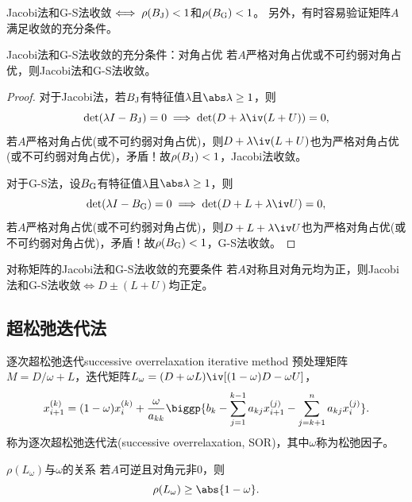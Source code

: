 \begin{remark}
    Jacobi法和G-S法收敛$\iff\rho(B_\text J)<1$和$\rho(B_\text G)<1$。
    另外，有时容易验证矩阵$A$满足收敛的充分条件。
\end{remark}

\begin{theorem}
    {Jacobi法和G-S法收敛的充分条件：对角占优}{}
    若$A$严格对角占优或不可约弱对角占优，则Jacobi法和G-S法收敛。
\end{theorem}

\begin{proof}
    对于Jacobi法，若$B_\text J$有特征值$\lambda$且$\abs\lambda\geq 1$，则 
    \[
        \det(\lambda I-B_\text J)=0\implies\det(D+\lambda\iv(L+U))=0,
    \]
    若$A$严格对角占优(或不可约弱对角占优)，则$D+\lambda\iv(L+U)$也为严格对角占优(或不可约弱对角占优)，矛盾！故$\rho(B_\text J)<1$，Jacobi法收敛。

    对于G-S法，设$B_\text G$有特征值$\lambda$且$\abs\lambda\geq 1$，则 
    \[
        \det(\lambda I-B_\text G)=0\implies\det(D+L+\lambda\iv U)=0,
    \]
    若$A$严格对角占优(或不可约弱对角占优)，则$D+L+\lambda\iv U$也为严格对角占优(或不可约弱对角占优)，矛盾！故$\rho(B_\text G)<1$，G-S法收敛。
\end{proof}

\begin{theorem}
    {对称矩阵的Jacobi法和G-S法收敛的充要条件}{}
    若$A$对称且对角元均为正，则Jacobi法和G-S法收敛$\iff D\pm(L+U)$均正定。
\end{theorem}

\subsection{超松弛迭代法}

\begin{example}
    {逐次超松弛迭代}{successive overrelaxation iterative method}
    预处理矩阵$M=D/\omega+L$，迭代矩阵$L_\omega=(D+\omega L)\iv[(1-\omega)D-\omega U]$，
    \begin{equation}
        x_{i+1}^{(k)}=(1-\omega)x_i^{(k)}+\frac\omega{a_{kk}}\biggp{b_k-\sum_{j=1}^{k-1}a_{kj}x_{i+1}^{(j)}-\sum_{j=k+1}^na_{kj}x_i^{(j)}}.
    \end{equation}
    称为逐次超松弛迭代法(successive overrelaxation, SOR)，其中$\omega$称为松弛因子。
\end{example}

\begin{theorem}
    {$\rho(L_\omega)$与$\omega$的关系}{}
    若$A$可逆且对角元非0，则
    \begin{equation}
        \rho(L_\omega)\geq\abs{1-\omega}.
    \end{equation}
\end{theorem}

